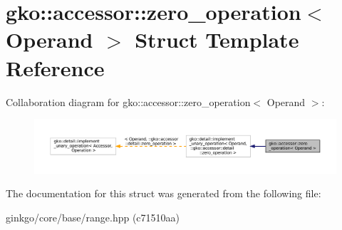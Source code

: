 \hypertarget{structgko_1_1accessor_1_1zero__operation}{}\section{gko\+:\+:accessor\+:\+:zero\+\_\+operation$<$ Operand $>$ Struct Template Reference}
\label{structgko_1_1accessor_1_1zero__operation}


Collaboration diagram for gko\+:\+:accessor\+:\+:zero\+\_\+operation$<$ Operand $>$\+:
\nopagebreak
\begin{figure}[H]
\begin{center}
\leavevmode
\includegraphics[width=350pt]{structgko_1_1accessor_1_1zero__operation__coll__graph}
\end{center}
\end{figure}


The documentation for this struct was generated from the following file\+:\begin{DoxyCompactItemize}
\item 
ginkgo/core/base/range.\+hpp (c71510aa)\end{DoxyCompactItemize}
